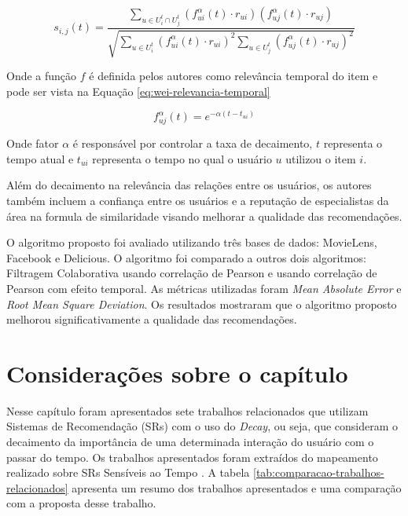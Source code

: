 \begin{equation}
  \label{eq:wei-similaridade}
  s_{i,j}(t) = \frac{\sum_{u \in U_i^t \cap U_j^t}{(f_{ui}^\alpha(t) \cdot r_{ui})(f_{uj}^\alpha(t) \cdot r_{uj})}}{\sqrt{\sum_{u \in U_i^t}{(f_{ui}^\alpha(t) \cdot r_{ui})}^2 \sum_{u \in U_j^t}{(f_{uj}^\alpha(t) \cdot r_{uj})}^2}}
\end{equation}

Onde a função $f$ é definida pelos autores como relevância temporal do item e pode ser vista na Equação \ref{eq:wei-relevancia-temporal}

\begin{equation}
  \label{eq:wei-relevancia-temporal}
  f_{uj}^\alpha(t) = e^{- \alpha (t - t_{ui})}
\end{equation}

Onde fator $\alpha$ é responsável por controlar a taxa de decaimento, $t$ representa o tempo atual e $t_{ui}$ representa
o tempo no qual o usuário $u$ utilizou o item $i$.

Além do decaimento na relevância das relações entre os usuários, os autores também incluem a confiança entre os
usuários e a reputação de especialistas da área na formula de similaridade visando melhorar a qualidade das
recomendações.

O algoritmo proposto foi avaliado utilizando três bases de dados: MovieLens, Facebook e Delicious. O algoritmo foi
comparado a outros dois algoritmos: Filtragem Colaborativa usando correlação de Pearson e usando correlação de Pearson
com efeito temporal. As métricas utilizadas foram \textit{Mean Absolute Error} e \textit{Root Mean Square Deviation}.
Os resultados mostraram que o algoritmo proposto melhorou significativamente a qualidade das recomendações.

\section{Considerações sobre o capítulo}

Nesse capítulo foram apresentados sete trabalhos relacionados que utilizam Sistemas de Recomendação (SRs) com o uso do
\textit{Decay}, ou seja, que consideram o decaimento da importância de uma determinada interação do usuário com o passar
do tempo. Os trabalhos apresentados foram extraídos do mapeamento realizado sobre SRs Sensíveis ao Tempo \cite{de2017time}.
A tabela \ref{tab:comparacao-trabalhos-relacionados} apresenta um resumo dos trabalhos apresentados e uma comparação com
a proposta desse trabalho.


